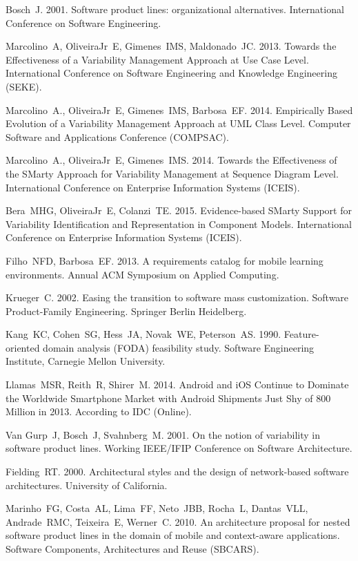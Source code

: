 \documentclass[preprint,12pt]{elsarticle}
\begin{document}
\begin{thebibliography}{33}
 Bosch~J. 2001. Software product lines: organizational alternatives. International Conference on Software Engineering.

 Marcolino~A, OliveiraJr~E, Gimenes~IMS, Maldonado~JC. 2013. Towards the Effectiveness of a Variability Management Approach at Use Case Level. International Conference on Software Engineering and Knowledge Engineering (SEKE).

 Marcolino~A., OliveiraJr~E, Gimenes~IMS, Barbosa~EF. 2014. Empirically Based Evolution of a Variability Management Approach at UML Class Level. Computer Software and Applications Conference (COMPSAC).

 Marcolino~A., OliveiraJr~E, Gimenes~IMS. 2014. Towards the Effectiveness of the SMarty Approach for Variability Management at Sequence Diagram Level. International Conference on Enterprise Information Systems (ICEIS).

 Bera~MHG, OliveiraJr~E, Colanzi~TE. 2015. Evidence-based SMarty Support for Variability Identification and Representation in Component Models. International Conference on Enterprise Information Systems (ICEIS).

 Filho~NFD, Barbosa~EF. 2013. A requirements catalog for mobile learning environments. Annual ACM Symposium on Applied Computing.

 Krueger~C. 2002. Easing the transition to software mass customization. Software Product-Family Engineering. Springer Berlin Heidelberg.

 Kang~KC, Cohen~SG, Hess~JA, Novak~WE, Peterson~AS. 1990. Feature-oriented domain analysis (FODA) feasibility study. Software Engineering Institute, Carnegie Mellon University.

 Llamas~MSR, Reith~R, Shirer~M. 2014. Android and iOS Continue to Dominate the Worldwide Smartphone Market with Android Shipments Just Shy of 800 Million in 2013. According to IDC (Online).

 Van Gurp~J, Bosch~J, Svahnberg~M. 2001. On the notion of variability in software product lines. Working IEEE/IFIP Conference on Software Architecture.

 Fielding~RT. 2000. Architectural styles and the design of network-based software architectures. University of California.

 Marinho~FG, Costa~AL, Lima~FF, Neto~JBB, Rocha~L, Dantas~VLL, Andrade~RMC, Teixeira~E, Werner~C. 2010. An architecture proposal for nested software product lines in the domain of mobile and context-aware applications. Software Components, Architectures and Reuse (SBCARS).


\end{thebibliography}
\end{document}
